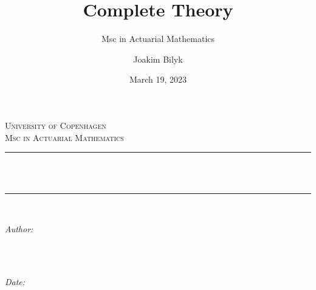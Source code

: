 \documentclass[
]{book}
\title{Complete Theory}
\subtitle{Msc in Actuarial Mathematics}
\author{Joakim Bilyk}
\date{March 19, 2023}
\begin{document}


{
\begin{titlepage}
\newcommand{\HRule}{\rule{\linewidth}{0.5mm}} %

\center %
 

\textsc{\LARGE University of Copenhagen}\\[4cm] %
\textsc{\Large Msc in Actuarial Mathematics}\\[0.5cm] %


\HRule \\[0.4cm]
{ \huge \bfseries \thetitle}\\[0.4cm] %
\HRule \\[1.5cm]
 

\begin{minipage}{0.4\textwidth}
\begin{flushleft} \large
\emph{Author:}\\
\textsc{\theauthor} \\
\end{flushleft}
\end{minipage}
~
\begin{minipage}{0.4\textwidth}
\begin{flushright} \large
\emph{Date:} \\
\textsc{\thedate} \\
\end{flushright}
\end{minipage}\\[2cm]


\end{titlepage}}
\end{document}
